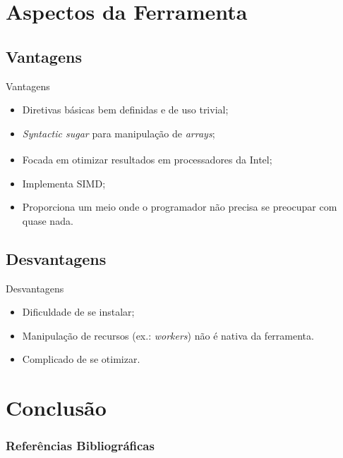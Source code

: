 \documentclass{beamer}
\begin{document}
\section{Aspectos da Ferramenta}
\subsection{Vantagens}
\begin{frame}{Vantagens}
\begin{itemize}
    \item Diretivas básicas bem definidas e de uso trivial;
    \item \textit{Syntactic sugar} para manipulação de \textit{arrays};
    \item Focada em otimizar resultados em processadores da
    Intel\textsuperscript{\textregistered};
    \item Implementa SIMD;
    \item Proporciona um meio onde o programador não precisa se preocupar com
    quase nada.
\end{itemize}
\end{frame}



\subsection{Desvantagens}
\begin{frame}{Desvantagens}
\begin{itemize}
    \item Dificuldade de se instalar;
    \item Manipulação de recursos (ex.: \textit{workers}) não é nativa da
    ferramenta.
    \item Complicado de se otimizar.
\end{itemize}

\end{frame}


\section{Conclusão}
\begin{frame}%
    \frametitle{Referências Bibliográficas}
    \tiny{}
    
\end{frame}
\end{document}
